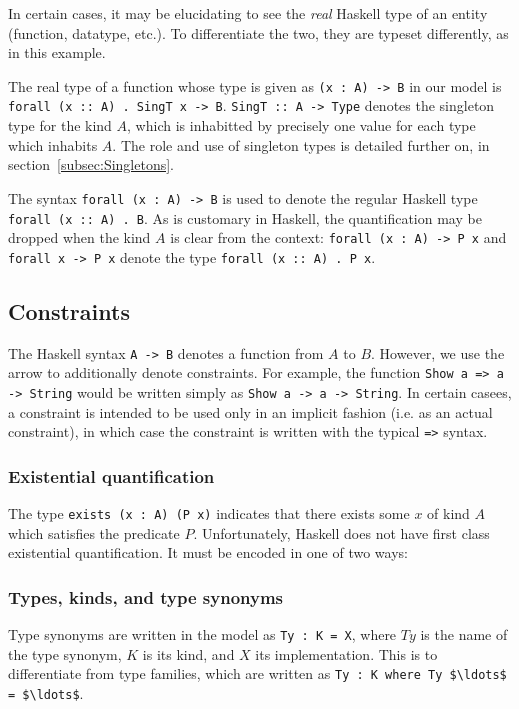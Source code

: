 In certain cases, it may be elucidating to see the \emph{real} Haskell type of
an entity (function, datatype, etc.). To differentiate the two, they are typeset
differently, as in this example.

The real type of a function whose type is given as \lstinline!(x : A) -> B! in
our model is \texttt{forall (x :: A) . SingT x -> B}. \texttt{SingT :: A -> 
Type}
denotes the singleton type for the kind $A$, which is inhabitted by precisely
one value for each type which inhabits $A$. The role and use of singleton types
is detailed further on, in section~\ref{subsec:Singletons}. 

The syntax \lstinline!forall (x : A) -> B! is used to denote the regular
Haskell type \texttt{forall (x :: A) . B}. As is customary in Haskell, the 
quantification
may be dropped when the kind $A$ is clear from the context: 
\lstinline!forall (x : A) -> P x! and
\lstinline!forall x -> P x! denote the type \texttt{forall (x :: A) . P x}.

\subsection{Constraints}
The Haskell syntax \texttt{A -> B} denotes a function from $A$ to $B$. However,
we use the arrow to additionally denote constraints. For example, the function
\texttt{Show a => a -> String} would be written simply as 
\lstinline!Show a -> a -> String!.
In certain casees, a constraint is intended to be used only in an implicit 
fashion 
(i.e. as an actual constraint), in which case the constraint is written with 
the typical \lstinline{=>} syntax. 

\subsubsection{Existential quantification}
The type \lstinline!exists (x : A) (P x)! indicates that there exists some $x$
of kind $A$ which satisfies the predicate $P$. Unfortunately, Haskell does not
have first class existential quantification. It must be encoded in one of
two ways:

\subsubsection{Types, kinds, and type synonyms}
Type synonyms are written in the model as \lstinline!Ty : K = X!, where $Ty$ is 
the name
of the type synonym, $K$ is its kind, and $X$ its implementation. This is to 
differentiate
from type families, which are written as 
\lstinline!Ty : K where Ty $\ldots$ = $\ldots$!.

